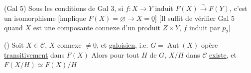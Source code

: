(Gal 5) Sous les conditions de Gal 3, si   $f:X\to Y$
induit $F(X)\xrightarrow{\sim}F(Y)$, c'est un isomorphisme
[implique $F(X)=\varnothing\to X=\underline{0}$] [Il suffit
de vérifier Gal 5 quand $X$ est une composante
connexe d'un produit $Z\times Y$, $f$ induit par $p_2$]

() Soit $X\in\mathcal C$, $X$ connexe $\ne\underline{0}$, et \uline{galoisien},  i.e.
 $G=\operatorname{Aut}(X)$ opère \uline{transitivement} dans $F(X)$
Alors pour tout  $H$ de $G$, $X/H$ dans $\mathcal C$ \uline{existe},
et $F(X/H)\simeq F(X)/H$
